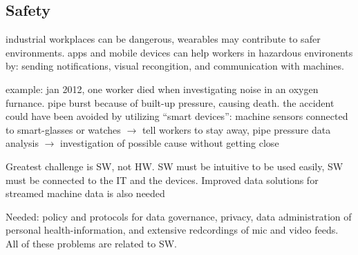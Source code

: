 \subsection{Safety}
industrial workplaces can be dangerous, wearables may contribute to safer environments. apps and mobile devices can help workers in hazardous environents by: sending notifications, visual recongition, and communication with machines. \cite{sda-wired}

example: jan 2012, one worker died when investigating noise in an oxygen furnance. pipe burst because of built-up pressure, causing death. the accident could have been avoided by utilizing ``smart devices'': machine sensors connected to smart-glasses or watches \(\rightarrow\) tell workers to stay away, pipe pressure data analysis \(\rightarrow\) investigation of possible cause without getting close\cite{sda-wired}

Greatest challenge is SW, not HW. SW must be intuitive to be used easily, SW must be connected to the IT and the devices. Improved data solutions for streamed machine data is also needed\cite{sda-wired}

Needed: policy and protocols for data governance, privacy, data administration of personal health-information, and extensive redcordings of mic and video feeds. All of these problems are related to SW. \cite{sda-wired}

